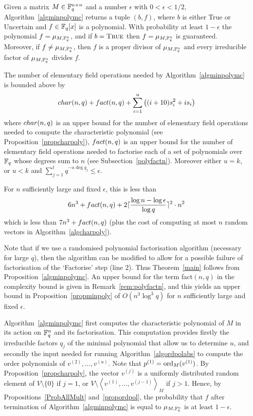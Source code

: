 \begin{Prop}\label{propminpoly}
Given a matrix $M \in \mathbb{F}_q^{n \times n}$ and a number
$\epsilon$ with $0 < \epsilon < 1/2$, Algorithm~\ref{algminpolymc}
returns a tuple $(b,f)$, where $b$ is either {\sc True} or {\sc Uncertain}
and $f \in \mathbb{F}_q[x]$ is a polynomial. With probability at least $1-\epsilon$
the polynomial $f=\mu_{M,\mathbb{F}_q^n}$, and if
\/ $b = \mbox{\sc True}$ then
$f = \mu_{M,\mathbb{F}_q^n}$ is guaranteed. Moreover, 
if\/ $f \ne \mu_{M,\mathbb{F}_q^n}$, then 
$f$ is a proper divisor of $\mu_{M,\mathbb{F}_q^n}$ and
every irreducible factor of $\mu_{M,\mathbb{F}_q^n}$ divides $f$.

The number of elementary field operations needed by 
Algorithm~\ref{algminpolymc} is bounded above by
\[ 
{\rm char}(n,q) + {\rm fact}(n,q) + \sum_{i=1}^u \left( (i+10)s_i^2 + is_i \right) 
\]
where ${\rm char}(n,q)$ is an upper bound for the number of elementary field operations needed to
compute the characteristic polynomial (see
Proposition~\ref{propcharpoly}), ${\rm fact}(n,q)$ is an upper bound for 
the number of elementary field
operations needed to factorise each of a set of polynomials over $\mathbb{F}_q$ whose degrees sum to $n$
(see Subsection~{\rm\ref{polyfactn}}). Moreover either $u=k$, or $u<k$ and
$\sum_{j=1}^t q^{-u\deg q_j} \le \epsilon$.

For $n$ sufficiently large and fixed $\epsilon$, this is less than
\[ 6n^3 + {\rm fact}(n,q) + 
  2 \lceil\frac{\log n-\log \epsilon}{\log q}\rceil^2 \cdot n^2 
\]
which is less than $7n^3 + {\rm fact}(n,q)$ (plus the cost of computing at most $n$ random 
vectors in Algorithm~\ref{algcharpoly}).
\end{Prop}


\begin{Rem}
Note that if we use a randomised polynomial factorisation algorithm
(necessary for large $q$), then the algorithm can be modified to allow
for a possible failure of factorisation of the `Factorise' step (line
2). Thus Theorem~\ref{main} follows from Proposition~\ref{algminpolymc}.
An upper bound for the term {\rm fact}$(n,q)$ in the complexity
bound is given in Remark~{\rm\ref{rem:polyfactn}}, and this yields an
upper bound in Proposition~{\rm\ref{propminpoly}} of $O(n^3\log^3 q)$
for $n$ sufficiently large and fixed $\epsilon$.
\end{Rem}

Algorithm~\ref{algminpolymc} first computes the characteristic polynomial
of $M$ in its action on $\mathbb{F}_q^n$ and its factorisation. This computation provides
firstly the irreducible factors $q_j$ of the minimal polynomial that allow us 
to determine $u$, and secondly the input needed for running Algorithm~\ref{algordpolabs}
to compute the order polynomials of $v^{(2)}, \ldots, v^{(u)}$. Note that
$p^{(1)} = \mathrm{ord}_M(v^{(1)})$. By Proposition~\ref{propcharpoly}, the vector $v^{(j)}$ 
is a uniformly distributed random element of $V\setminus\{0\}$ if $j=1$, or
$V\setminus\left< v^{(1)}, \ldots, v^{(j-1)}\right>_M$ if $j>1$.
Hence, by Propositions~\ref{ProbAllMult} and~\ref{propordpol}, the probability that
$f$ after termination of Algorithm~\ref{algminpolymc} is equal to
$\mu_{M,\mathbb{F}_q^n}$ is at least $1-\epsilon$. 

